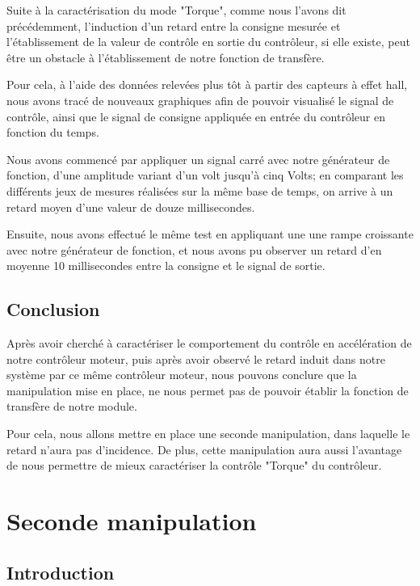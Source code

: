 \documentclass[french,a4paper,12pt]{report}
\begin{document}
		Suite à la caractérisation du mode "Torque", comme nous l'avons dit précédemment, l'induction d'un retard entre la consigne mesurée et l'établissement de la valeur de contrôle en sortie du contrôleur, si elle existe, peut être un obstacle à l'établissement de notre fonction de transfère.
		
		Pour cela, à l'aide des données relevées plus tôt à partir des capteurs à effet hall, nous avons tracé de nouveaux graphiques afin de pouvoir visualisé le signal de contrôle, ainsi que le signal de consigne appliquée en entrée du contrôleur en fonction du temps.
		
		Nous avons commencé par appliquer un signal carré avec notre générateur de fonction, d'une amplitude variant d'un volt jusqu'à cinq Volts; en comparant les différents jeux de mesures réalisées sur la même base de temps, on arrive à un retard moyen d'une valeur de douze millisecondes.
		
		Ensuite, nous avons effectué le même test en appliquant une une rampe croissante avec notre générateur de fonction, et nous avons pu observer un retard d'en moyenne 10 millisecondes entre la consigne et le signal de sortie.
		
		\subsection{Conclusion}
		Après avoir cherché à caractériser le comportement du contrôle en accélération de notre contrôleur moteur, puis après avoir observé le retard induit dans notre système par ce même contrôleur moteur, nous pouvons conclure que la manipulation mise en place, ne nous permet pas de pouvoir établir la fonction de transfère de notre module.
		
		Pour cela, nous allons mettre en place une seconde manipulation, dans laquelle le retard n'aura pas d'incidence. De plus, cette manipulation aura aussi l'avantage de nous permettre de mieux caractériser la contrôle "Torque" du contrôleur.
		
		\newpage		
		
	\section{Seconde manipulation}
	
		\subsection{Introduction}
	
\end{document}
